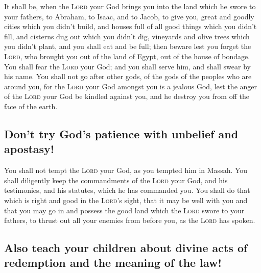  It shall be, when the \textsc{Lord} your God brings you
into the land which he swore to your fathers, to Abraham, to Isaac, and
to Jacob, to give you, great and goodly cities which you didn't build,
 and houses full of all good things which you didn't
fill, and cisterns dug out which you didn't dig, vineyards and olive
trees which you didn't plant, and you shall eat and be full;
 then beware lest you forget the \textsc{Lord}, who
brought you out of the land of Egypt, out of the house of bondage.
 You shall fear the \textsc{Lord} your God; and you shall
serve him, and shall swear by his name.  You shall not go
after other gods, of the gods of the peoples who are around you,
 for the \textsc{Lord} your God amongst you is a jealous
God, lest the anger of the \textsc{Lord} your God be kindled against
you, and he destroy you from off the face of the earth.

\hypertarget{dont-try-gods-patience-with-unbelief-and-apostasy}{%
\subsection{Don't try God's patience with unbelief and
apostasy!}\label{dont-try-gods-patience-with-unbelief-and-apostasy}}

 You shall not tempt the \textsc{Lord} your God, as you
tempted him in Massah.  You shall diligently keep the
commandments of the \textsc{Lord} your God, and his testimonies, and his
statutes, which he has commanded you.  You shall do that
which is right and good in the \textsc{Lord}'s sight, that it may be
well with you and that you may go in and possess the good land which the
\textsc{Lord} swore to your fathers,  to thrust out all
your enemies from before you, as the \textsc{Lord} has spoken.

\hypertarget{also-teach-your-children-about-divine-acts-of-redemption-and-the-meaning-of-the-law}{%
\subsection{Also teach your children about divine acts of redemption and
the meaning of the
law!}\label{also-teach-your-children-about-divine-acts-of-redemption-and-the-meaning-of-the-law}}

